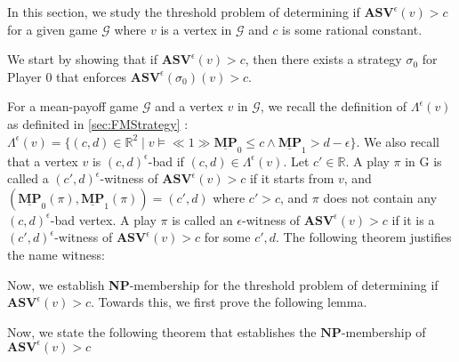 In this section, we study the threshold problem of determining if $\mathbf{ASV}^{\epsilon}(v) > c$  for a given game $\mathcal{G}$ where $v$ is a vertex in $\mathcal{G}$ and $c$ is some rational constant.

We start by showing that if $\mathbf{ASV}^{\epsilon}(v) > c$, then there exists a strategy $\sigma_0$ for Player 0 that enforces $\mathbf{ASV}^{\epsilon}(\sigma_0)(v) > c$.



For a mean-payoff game $\mathcal{G}$ and a vertex $v$ in $\mathcal{G}$, we recall the definition of $\Lambda^{\epsilon}(v)$ as definited in \cref{sec:FMStrategy} : $\Lambda^{\epsilon}(v) = \{(c,d) \in \mathbb{R}^2 \mid v \models \ll 1 \gg \underline{\mathbf{MP}}_0 \leqslant c \land \underline{\mathbf{MP}}_1 > d-\epsilon \}$. We also recall that a vertex $v$ is $(c,d)^{\epsilon}$-bad if $(c,d) \in \Lambda^{\epsilon}(v)$. Let $c' \in \mathbb{R}$. A play $\pi$ in G is called a $(c',d)^{\epsilon}$-witness of $\mathbf{ASV}^{\epsilon}(v) > c$ if it starts from $v$, and $(\underline{\mathbf{MP}}_0(\pi), \underline{\mathbf{MP}}_1(\pi)) = (c', d)$ where $c' > c$, and $\pi$ does not contain any $(c,d)^{\epsilon}$-bad vertex. A play $\pi$ is called an $\epsilon$-witness of $\mathbf{ASV}^{\epsilon}(v) > c$ if it is a $(c',d)^{\epsilon}$-witness of $\mathbf{ASV}^{\epsilon}(v) > c$ for some $c',d$. The following theorem justifies the name witness:



Now, we establish \textbf{NP}-membership for the threshold problem of determining if $\mathbf{ASV}^{\epsilon}(v) > c$. Towards this, we first prove the following lemma.



Now, we state the following theorem that establishes the $\mathbf{NP}$-membership of $\mathbf{ASV}^{\epsilon}(v) > c$
